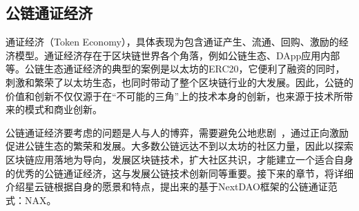 \subsection{公链通证经济}
通证经济（Token Economy），具体表现为包含通证产生、流通、回购、激励的经济模型。通证经济存在于区块链世界各个角落，例如公链生态、DApp应用内部等。公链生态通证经济的典型的案例是以太坊的ERC20，它便利了融资的同时，刺激和繁荣了以太坊生态，也同时带动了整个区块链行业的大发展。因此，公链的价值和创新不仅仅源于在“不可能的三角”上的技术本身的创新，也来源于技术所带来的模式和商业创新。

公链通证经济要考虑的问题是人与人的博弈，需要避免公地悲剧~\cite{TragedyOfTheCommons}，通过正向激励促进公链生态的繁荣和发展。大多数公链远达不到以太坊的社区力量，因此以探索区块链应用落地为导向，发展区块链技术，扩大社区共识，才能建立一个适合自身的优秀的公链通证经济，这与发展公链技术创新同等重要。接下来的章节，将详细介绍星云链根据自身的愿景和特点，提出来的基于NextDAO框架的公链通证范式：NAX。

